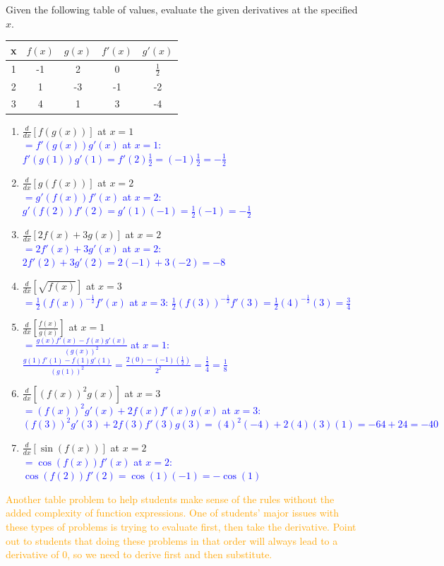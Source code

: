 \documentclass{ximera}
\begin{document}
\begin{exercise}
    Given the following table of values, evaluate the given derivatives at the specified $x$.\\
    \begin{tabular}{c|c|c|c|c}
        x & $f(x)$ & $g(x)$ & $f'(x)$ & $g'(x)$  \\ \hline
        1 & -1 & 2 & 0 & $\frac{1}{2}$\\
        2 & 1 & -3 & -1 & -2 \\
        3 & 4 & 1 & 3 & -4 
    \end{tabular}
    \begin{enumerate}
        \item[a.] $\frac{d}{dx}[f(g(x))]$ at $x=1$\\
        \textcolor{blue}{ $=f'(g(x))g'(x)$ at $x=1$: $f'(g(1))g'(1)=f'(2)\frac12=(-1)\frac12=-\frac12$}

        \item[b.] $\frac{d}{dx}[g(f(x))]$ at $x=2$\\
        \textcolor{blue}{ $=g'(f(x))f'(x)$ at $x=2$: $g'(f(2))f'(2)=g'(1)(-1)=\frac12(-1)=-\frac12$}

        \item[c.] $\frac{d}{dx}[2f(x)+3g(x)]$ at $x=2$\\
        \textcolor{blue}{ $=2f'(x)+3g'(x)$ at $x=2$: $2f'(2)+3g'(2)=2(-1)+3(-2)=-8$}

        \item[d.] $\frac{d}{dx}[\sqrt{f(x)}]$ at $x=3$\\
        \textcolor{blue}{ $=\frac12(f(x))^{-\frac12}f'(x)$ at $x=3$: $\frac12(f(3))^{-\frac12}f'(3)=\frac12(4)^{-\frac12}(3)=\frac34$}

        \item[e.] $\frac{d}{dx}[\frac{f(x)}{g(x)}]$ at $x=1$\\
        \textcolor{blue}{ $=\frac{g(x)f'(x)-f(x)g'(x)}{(g(x))^2}$ at $x=1$: $\frac{g(1)f'(1)-f(1)g'(1)}{(g(1))^2}=\frac{2(0)-(-1)(\frac12)}{2^2}=\frac{\frac{1}{2}}{4}=\frac18$}

        \item[f.] $\frac{d}{dx}[(f(x))^2g(x)]$ at $x=3$\\
        \textcolor{blue}{ $=(f(x))^2g'(x)+2f(x)f'(x)g(x)$ at $x=3$: \\$(f(3))^2g'(3)+2f(3)f'(3)g(3)=(4)^2(-4)+2(4)(3)(1)=-64+24=-40$}

        \item $\frac{d}{dx}[\sin(f(x))]$ at $x=2$\\
        \textcolor{blue}{$=\cos(f(x))f'(x)$ at $x=2$: $\cos(f(2))f'(2)=\cos(1)(-1)=-\cos(1)$}
    \end{enumerate}
    \textcolor{orange}{Another table problem to help students make sense of the rules without the added complexity of function expressions.  One of students' major issues with these types of problems is trying to evaluate first, then take the derivative.  Point out to students that doing these problems in that order will always lead to a derivative of 0, so we need to derive first and then substitute.}
\end{exercise}
\end{document}

